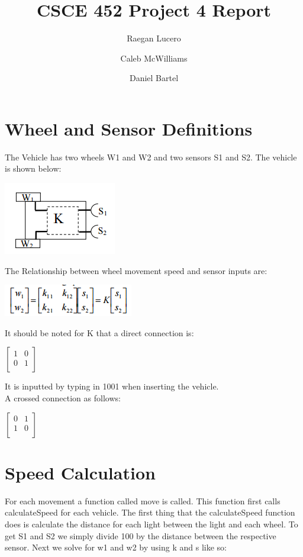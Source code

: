 \documentclass{article}
\title{CSCE 452 Project 4 Report}
\author{Raegan Lucero
\and
 Caleb McWilliams
\and
 Daniel Bartel}
\date{}
\begin{document}
\maketitle

\section*{Wheel and Sensor Definitions}

The Vehicle has two wheels W1 and W2 and two sensors S1 and S2. The vehicle is shown below:
\begin{center}
\includegraphics{vehicle}
\end{center}
The Relationship between wheel movement speed and sensor inputs are:
\begin{center}
\includegraphics{Wheelspeeds}
\end{center}
It should be noted for K that a direct connection is:
\begin{center}
$
\begin{bmatrix}
1 & 0\\

0 & 1 \\

\end{bmatrix}
$
\end{center}
It is inputted by typing in 1001 when inserting the vehicle.
\\
A crossed connection as follows:
\begin{center}
$
\begin{bmatrix}
0 & 1\\

1 & 0 \\

\end{bmatrix}
$
\end{center}
\section*{Speed Calculation}
For each movement a function called move is called. This function first calls calculateSpeed for each vehicle. The first thing that the calculateSpeed function does is calculate the distance for each light between the light and each wheel. To get S1 and S2 we simply divide 100 by the distance between the respective sensor. Next we solve for w1 and w2 by using k and s like so:
\end{document}
